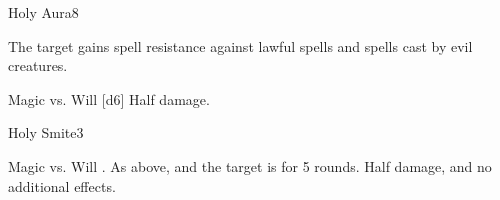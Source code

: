 \begin{spellsection}{Holy Aura}{8}
    \begin{spellheader}
    \end{spellheader}
    \begin{spellcontent}
        \begin{spelltargetinginfo}
        \end{spelltargetinginfo}
        \begin{spelleffects}
            \spelleffect The target gains spell resistance against lawful spells and spells cast by evil creatures.
            \spelldur \durshort \dismissable
        \end{spelleffects}
    \end{spellcontent}
    \begin{spellsubcontent}
        \begin{spelltargetinginfo}
        \end{spelltargetinginfo}
        \begin{spelleffects}
            \begin{spellattack}{Magic vs. Will}
                \spellsuccess {}[d6]
                \spellfailure Half damage.
            \end{spellattack}
        \end{spelleffects}
    \end{spellsubcontent}
    \begin{spellfooter}
        \miscastexplode
    \end{spellfooter}
\end{spellsection}

\begin{spellsection}{Holy Smite}{3}
    \begin{spellheader}
    \end{spellheader}
    \begin{spellcontent}
        \begin{spelltargetinginfo}
        \end{spelltargetinginfo}
        \begin{spelleffects}
            \begin{spellattack}{Magic vs. Will}
                \spellsuccess {}.
                \spellcritical As above, and the target is \dazed for 5 rounds.
                \spellfailure Half damage, and no additional effects.
            \end{spellattack}
        \end{spelleffects}
    \end{spellcontent}
    \begin{spellfooter}
        \miscastrandom
    \end{spellfooter}
\end{spellsection}

